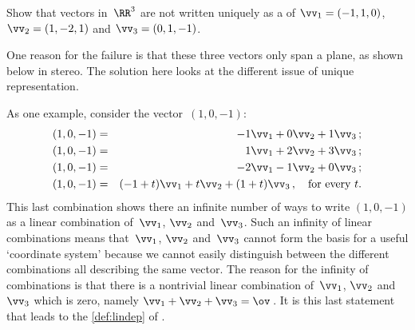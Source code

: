 \begin{example}[3D failure] \label{eg:}
Show that vectors in~\(\RR^3\) are not written uniquely as a  of \(\vv_1=(-1,1,0)\), \(\vv_2=(1,-2,1)\) and \(\vv_3=(0,1,-1)\). 

One reason for the failure is that these three vectors only span a plane, as shown below in stereo.  
The solution here looks at the different issue of unique representation.
\begin{center}
\end{center}
\begin{solution} 
As one example, consider the vector~\((1,0,-1)\):
\begin{eqnarray*}
(1,0,-1)&=&-1\vv_1+0\vv_2+1\vv_3\,;
\\(1,0,-1)&=&1\vv_1+2\vv_2+3\vv_3\,;
\\(1,0,-1)&=&-2\vv_1-1\vv_2+0\vv_3\,;
\\(1,0,-1)&=&(-1+t)\vv_1+t\vv_2+(1+t)\vv_3\,,\quad\text{for every }t.
\end{eqnarray*}
This last combination shows there an infinite number of ways to write \((1,0,-1)\) as a linear combination of~\(\vv_1\), \(\vv_2\) and~\(\vv_3\).
Such an infinity of linear combinations means that~\(\vv_1\), \(\vv_2\) and~\(\vv_3\) cannot form the basis for a useful `coordinate system' because we cannot easily distinguish between the different combinations all describing the same vector.
The reason for the infinity of combinations is that there is a nontrivial linear combination of~\(\vv_1\), \(\vv_2\) and~\(\vv_3\) which is zero, namely \(\vv_1+\vv_2+\vv_3=\ov\)\,.
It is this last statement that leads to the \autoref{def:lindep} of .
\end{solution}
\end{example}





